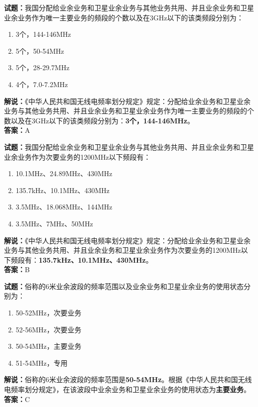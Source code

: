 \documentclass{ctexbook}
\begin{document}
\bigskip




\noindent\textbf{试题：}我国分配给业余业务和卫星业余业务与其他业务共用、并且业余业务和卫星业余业务作为唯一主要业务的频段的个数以及在3\unit{\GHz}以下的该类频段分别为：
\begin{enumerate}[leftmargin=3em]
\item 3个，144-146\unit{\MHz}
\item 5个，50-54\unit{\MHz}
\item 5个，28-29.7\unit{\MHz}
\item 4个，7.0-7.2\unit{\MHz}
\end{enumerate}
\noindent\textbf{解说：}《中华人民共和国无线电频率划分规定》规定：分配给业余业务和卫星业余业务与其他业务共用、并且业余业务和卫星业余业务作为唯一主要业务的频段的个数以及在3\unit{\GHz}以下的该类频段分别为：\textbf{3个，144-146\unit{\MHz}}。\\\noindent\textbf{答案：}A
\bigskip




\noindent\textbf{试题：}我国分配给业余业务和卫星业余业务与其他业务共用、并且业余业务和卫星业余业务作为次要业务的1200\unit{\MHz}以下频段有：
\begin{enumerate}[leftmargin=3em]
\item 10.1\unit{\MHz}、24.89\unit{\MHz}、430\unit{\MHz}
\item 135.7\unit{\kHz}、10.1\unit{\MHz}、430\unit{\MHz}
\item 3.5\unit{\MHz}、18.068\unit{\MHz}、144\unit{\MHz}
\item 3.5\unit{\MHz}、7\unit{\MHz}、50\unit{\MHz}
\end{enumerate}
\noindent\textbf{解说：}《中华人民共和国无线电频率划分规定》规定：分配给业余业务和卫星业余业务与其他业务共用、并且业余业务和卫星业余业务作为次要业务的1200\unit{\MHz}以下频段有：\textbf{135.7\unit{\kHz}、10.1\unit{\MHz}、430\unit{\MHz}}。\\\noindent\textbf{答案：}B

\bigskip




\noindent\textbf{试题：}俗称的6米业余波段的频率范围以及业余业务和卫星业余业务的使用状态分别为：
\begin{enumerate}[leftmargin=3em]
\item 50-52\unit{\MHz}，次要业务
\item 52-56\unit{\MHz}，次要业务
\item 50-54\unit{\MHz}，主要业务
\item 51-54\unit{\MHz}，专用
\end{enumerate}
\noindent\textbf{解说：}俗称的6米业余波段的频率范围是\textbf{50-54\unit{\MHz}}。根据《中华人民共和国无线电频率划分规定》，在该波段中业余业务和卫星业余业务的使用状态为\textbf{主要业务}。\\\noindent\textbf{答案：}C
\end{document}
